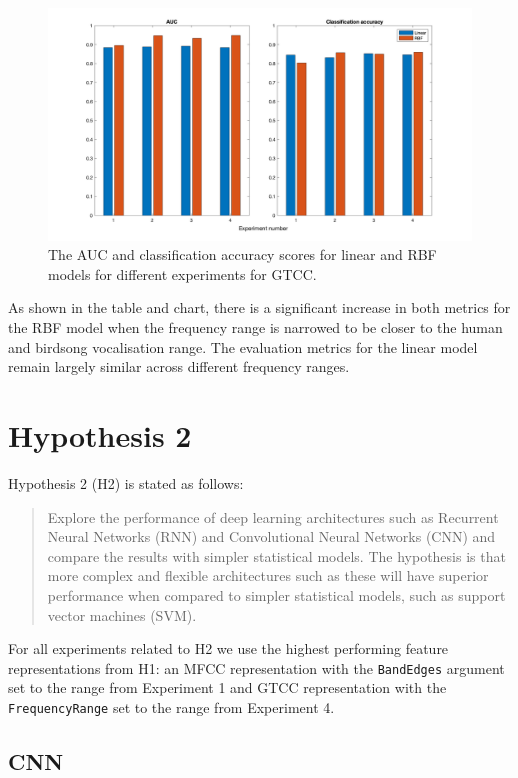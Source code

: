 \begin{figure}[ht]
  \centering
  \includegraphics[width=\textwidth]{figures/hyp1_gtcc.png}
  \caption{The AUC and classification accuracy scores for linear and RBF models
  for different experiments for GTCC.}\label{fig:hyp1_gtcc}
\end{figure}

As shown in the table and chart, there is a significant increase in both metrics
for the RBF model when the frequency range is narrowed to be closer to the human
and birdsong vocalisation range. The evaluation metrics for the linear model
remain largely similar across different frequency ranges.

\section{Hypothesis 2}

Hypothesis 2 (H2) is stated as follows:

\begin{quote}
  Explore the performance of deep learning architectures such as Recurrent
  Neural Networks (RNN) and Convolutional Neural Networks (CNN) and compare the
  results with simpler statistical models. The hypothesis is that more complex
  and flexible architectures such as these will have superior performance when
  compared to simpler statistical models, such as support vector machines (SVM).
\end{quote}

For all experiments related to H2 we use the highest performing feature
representations from H1: an MFCC representation with the \texttt{BandEdges}
argument set to the range from Experiment 1 and GTCC representation with the
\texttt{FrequencyRange} set to the range from Experiment 4.

\subsection{CNN}

